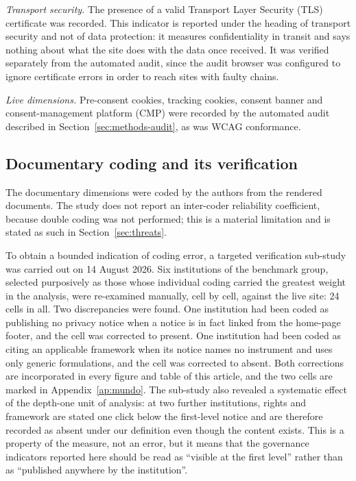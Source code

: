 \documentclass[pdflatex,sn-basic,Numbered,iicol]{sn-jnl}
\theoremstyle{thmstyleone}
\theoremstyle{thmstyletwo}
\theoremstyle{thmstylethree}
\begin{document}
	\emph{Transport security.} The presence of a valid Transport Layer Security (TLS) certificate was recorded. This indicator is reported under the heading of transport security and not of data protection: it measures confidentiality in transit and says nothing about what the site does with the data once received. It was verified separately from the automated audit, since the audit browser was configured to ignore certificate errors in order to reach sites with faulty chains.
	
	\emph{Live dimensions.} Pre-consent cookies, tracking cookies, consent banner and consent-management platform (CMP) were recorded by the automated audit described in Section~\ref{sec:methods-audit}, as was WCAG conformance.
	
	\subsection{Documentary coding and its verification}\label{sec:methods-coding}
	
	The documentary dimensions were coded by the authors from the rendered documents. The study does not report an inter-coder reliability coefficient, because double coding was not performed; this is a material limitation and is stated as such in Section~\ref{sec:threats}.
	
	To obtain a bounded indication of coding error, a targeted verification sub-study was carried out on 14 August 2026. Six institutions of the benchmark group, selected purposively as those whose individual coding carried the greatest weight in the analysis, were re-examined manually, cell by cell, against the live site: 24 cells in all. Two discrepancies were found. One institution had been coded as publishing no privacy notice when a notice is in fact linked from the home-page footer, and the cell was corrected to present. One institution had been coded as citing an applicable framework when its notice names no instrument and uses only generic formulations, and the cell was corrected to absent. Both corrections are incorporated in every figure and table of this article, and the two cells are marked in Appendix~\ref{ap:mundo}. The sub-study also revealed a systematic effect of the depth-one unit of analysis: at two further institutions, rights and framework are stated one click below the first-level notice and are therefore recorded as absent under our definition even though the content exists. This is a property of the measure, not an error, but it means that the governance indicators reported here should be read as ``visible at the first level'' rather than as ``published anywhere by the institution''.
	
\end{document}
